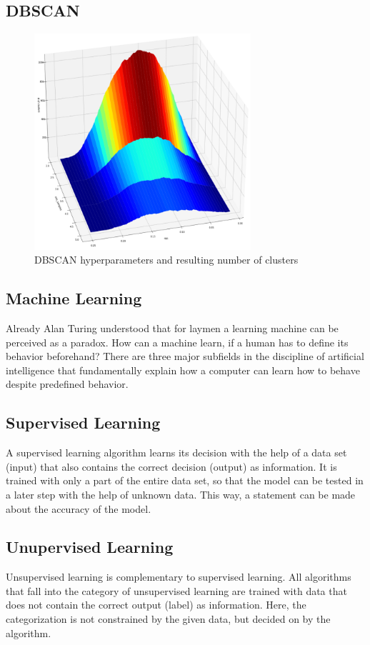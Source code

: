 		\subsection{DBSCAN}
		
		 \begin{figure}[ht]
			\centering
			\includegraphics[height=8cm]{Bilder/dbscan_plot.png}
			\caption{DBSCAN hyperparameters and resulting number of clusters}
			\label{fig:dbscan-plot}
		\end{figure}
		
		\subsection{Machine Learning}
		Already Alan Turing understood that for laymen a learning machine can be perceived as a paradox.  How can a machine learn, if a human has to define its behavior beforehand? There are three major subfields in the discipline of artificial intelligence that fundamentally explain how a computer can learn how to behave despite predefined behavior.
		
		\subsection{Supervised Learning}
		A supervised learning algorithm learns its decision with the help of a data set (input) that also contains the correct decision (output) as information. It is trained with only a part of the entire data set, so that the model can be tested in a later step with the help of unknown data. This way, a statement can be made about the accuracy of the model.
		
		\subsection{Unupervised Learning}
		Unsupervised learning is complementary to supervised learning. All algorithms that fall into the category of unsupervised learning are trained with data that does not contain the correct output (label) as information. Here, the categorization is not constrained by the given data, but decided on by the algorithm.
		
